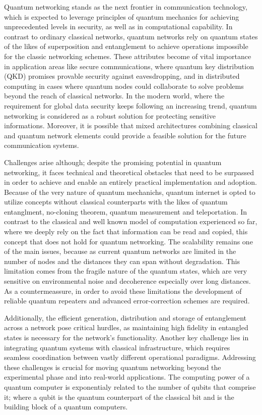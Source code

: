 \documentclass[12pt,a4paper] {report}
\begin{document}
		Quantum networking stands as the next frontier in communication technology,
		which is expected to leverage principles of quantum mechanics for
		achieving unprecedented levels in security, as well as in computational capability.
		In contrast to ordinary classical networks, quantum networks rely on quantum states
		of the likes of superposition and entanglement to achieve operations impossible for
	        the classic networking schemes. These attributes become of vital importance in 
		application areas like secure communications, where quantum key distribution (QKD) 
		promises provable security against eavesdropping, and in distributed computing in cases 
		where quantum nodes could collaborate to solve problems beyond the reach of classical networks.
		In the modern world, where the requirement for global data security keeps following
		an increasing trend, quantum networking is considered as a robust solution
		for protecting sensitive informations.
		Moreover, it is possible that mixed architectures combining classical and quantum network elements
		could provide a feasible solution for the future communication systems.

		Challenges arise although; despite the promising potential in quantum networking,
		it faces technical and theoretical obstacles that need to be surpassed
		in order to achieve and enable an entirely practical implementation and adoption.
		Because of the very nature of quantum mechanichs, quantum internet is opted to utilize concepts
		without classical counterparts with the likes of quantum entanglment,
		no-cloning theorem, quantum measurement and teleportation.
		In contrast to the classical and well known model of computation experienced so far,
		where we deeply rely on the fact that information can be read and copied, this concept that does not hold
		for quantum networking. 
		The scalability remains one of the main issues,
		because as current quantum networks are limited in the number of nodes and the
		distances they can span without degradation.
		This limitation comes from the fragile nature of the quantum states,
		which are very sensitive on environmental noise and decoherence especially over long distances.
		As a countermeassure, in order to avoid these limitations the development of reliable quantum repeaters
		and advanced error-correction schemes are required. 

		Additionally, the efficient generation, distribution and storage of entanglement 
		across a network pose critical hurdles, as maintaining high fidelity in entangled
		states is necessary for the network's functionality.
		Another key challenge lies in integrating
	        quantum systems with classical infrastructure,
	        which requires seamless coordination between
	        vastly different operational paradigms.
	        Addressing these challenges is crucial for moving quantum
		networking beyond the experimental
		phase and into real-world applications.
		The computing power of a quantum computer is exponentialy
		related to the number of qubits that comprise it;
		where a qubit is the quantum counterpart of the classical bit and is the building block of a quantum computers.
\end{document}
